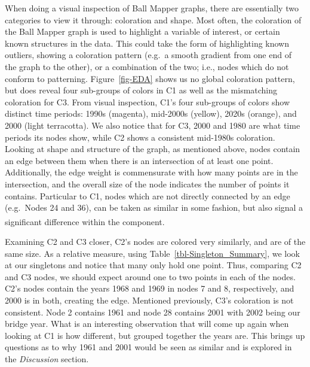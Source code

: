 \documentclass[
  10pt,
  letterpaper,
  DIV=11,
  numbers=noendperiod]{scrartcl}
\begin{document}
When doing a visual inspection of Ball Mapper graphs, there are
essentially two categories to view it through: coloration and shape.
Most often, the coloration of the Ball Mapper graph is used to highlight
a variable of interest, or certain known structures in the data. This
could take the form of highlighting known outliers, showing a coloration
pattern (e.g.~a smooth gradient from one end of the graph to the other),
or a combination of the two; i.e., nodes which do not conform to
patterning. Figure~\ref{fig-EDA} shows us no global coloration pattern,
but does reveal four sub-groups of colors in C1 as well as the
mismatching coloration for C3. From visual inspection, C1's four
sub-groups of colors show distinct time periods: 1990s (magenta),
mid-2000s (yellow), 2020s (orange), and 2000 (light terracotta). We also
notice that for C3, 2000 and 1980 are what time periods its nodes show,
while C2 shows a consistent mid-1980s coloration. Looking at shape and
structure of the graph, as mentioned above, nodes contain an edge
between them when there is an intersection of at least one point.
Additionally, the edge weight is commensurate with how many points are
in the intersection, and the overall size of the node indicates the
number of points it contains. Particular to C1, nodes which are not
directly connected by an edge (e.g.~Nodes 24 and 36), can be taken as
similar in some fashion, but also signal a significant difference within
the
component.\textsuperscript{}

Examining C2 and C3 closer, C2's nodes are colored very similarly, and
are of the same size. As a relative measure, using
Table~\ref{tbl-Singleton_Summary}, we look at our singletons and notice
that many only hold one point. Thus, comparing C2 and C3 nodes, we
should expect around one to two points in each of the nodes. C2's nodes
contain the years 1968 and 1969 in nodes 7 and 8, respectively, and 2000
is in both, creating the edge. Mentioned previously, C3's coloration is
not consistent. Node 2 contains 1961 and node 28 contains 2001 with 2002
being our bridge year. What is an interesting observation that will come
up again when looking at C1 is how different, but grouped together the
years are. This brings up questions as to why 1961 and 2001 would be
seen as similar and is explored in the \emph{Discussion} section.
\end{document}
